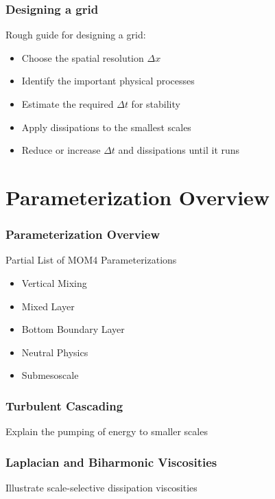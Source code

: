 \documentclass{beamer}
\begin{document}
\begin{frame}
    \frametitle{Designing a grid}
    
    Rough guide for designing a grid:
    \begin{itemize}
        \item Choose the spatial resolution $\Delta x$
        \item Identify the important physical processes
        \item Estimate the required $\Delta t$ for stability
        \item Apply dissipations to the smallest scales
        \item Reduce or increase $\Delta t$ and dissipations until it runs
    \end{itemize}
\end{frame}

\section{Parameterization Overview}
\begin{frame}
    \frametitle{Parameterization Overview}
    
    Partial List of MOM4 Parameterizations
    \begin{itemize}
        \item Vertical Mixing
        \item Mixed Layer
        \item Bottom Boundary Layer
        \item Neutral Physics
        \item Submesoscale
    \end{itemize}
\end{frame}

\begin{frame}
    \frametitle{Turbulent Cascading}

    Explain the pumping of energy to smaller scales
\end{frame}

\begin{frame}
    \frametitle{Laplacian and Biharmonic Viscosities}

    Illustrate scale-selective dissipation viscosities
\end{frame}
\end{document}
